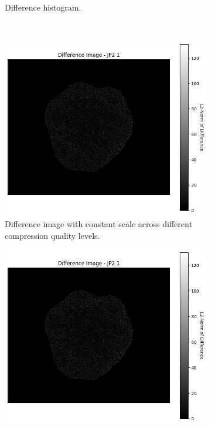 \begin{figure}[htb]
\begin{subfigure}[b]{0.48\textwidth}
        \caption{Difference histogram.}
        \label{fig:img_quality_comp_jp2_1_histo}
    \end{subfigure}
    \\
    \begin{subfigure}[b]{0.48\textwidth}
        \centering
        \includegraphics[width=\textwidth]{doc/thesis/0_figures/compare_quality/set1/jp2_1_diff_heatmap.png}
        \caption{Difference image with constant scale across different compression quality levels.}
        \label{fig:img_quality_comp_jp2_1_diff}
    \end{subfigure}
    \begin{subfigure}[b]{0.48\textwidth}
        \centering
        \includegraphics[width=\textwidth]{doc/thesis/0_figures/compare_quality/set1/jp2_1_diff_heatmap_rel.png}

\end{subfigure}
\end{figure}
